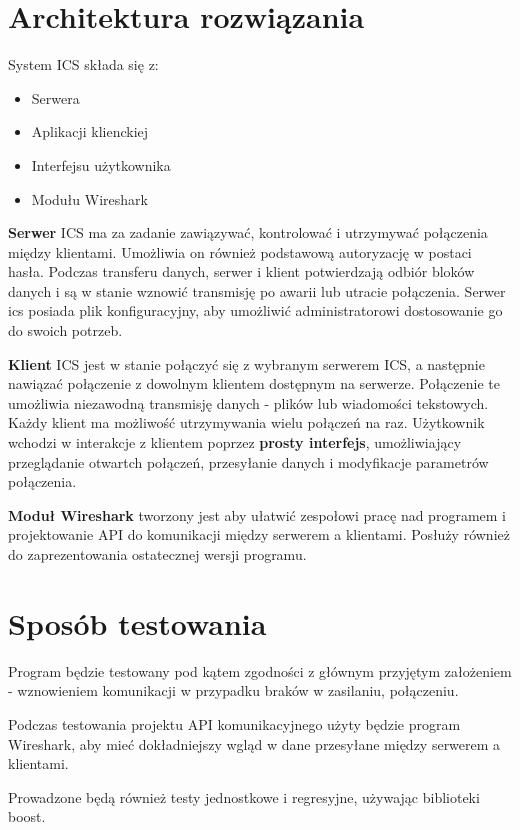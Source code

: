 \documentclass{article}
\begin{document}
\section{Architektura rozwiązania\label{arch}}

System ICS składa się z:
\begin{itemize}
\item Serwera
\item Aplikacji klienckiej
\item Interfejsu użytkownika
\item Modułu Wireshark
\end{itemize}

\textbf{Serwer} ICS ma za zadanie zawiązywać, kontrolować i utrzymywać połączenia między klientami. Umożliwia on również podstawową autoryzację w postaci hasła. Podczas transferu danych, serwer i klient potwierdzają odbiór bloków danych i są w stanie wznowić transmisję po awarii lub utracie połączenia. Serwer ics posiada plik konfiguracyjny, aby umożliwić administratorowi dostosowanie go do swoich potrzeb.


\textbf{Klient} ICS jest w stanie połączyć się z wybranym serwerem ICS, a następnie nawiązać połączenie z dowolnym klientem dostępnym na serwerze. Połączenie te umożliwia niezawodną transmisję danych -  plików lub wiadomości tekstowych. Każdy klient ma możliwość utrzymywania wielu połączeń na raz. Użytkownik wchodzi w interakcje z klientem poprzez \textbf{prosty interfejs}, umożliwiający przeglądanie otwartch połączeń, przesyłanie danych i modyfikacje parametrów połączenia.


\textbf{Moduł Wireshark} tworzony jest aby ułatwić zespołowi pracę nad programem i projektowanie API do komunikacji między serwerem a klientami. Posłuży również do zaprezentowania ostatecznej wersji programu.


\section{Sposób testowania\label{test}}

Program będzie testowany pod kątem zgodności z głównym przyjętym założeniem - wznowieniem komunikacji w przypadku braków w zasilaniu, połączeniu.


Podczas testowania projektu API komunikacyjnego użyty będzie program Wireshark, aby mieć dokładniejszy wgląd w dane przesyłane między serwerem a klientami.

Prowadzone będą również testy jednostkowe i regresyjne, używając biblioteki boost.
\end{document}
